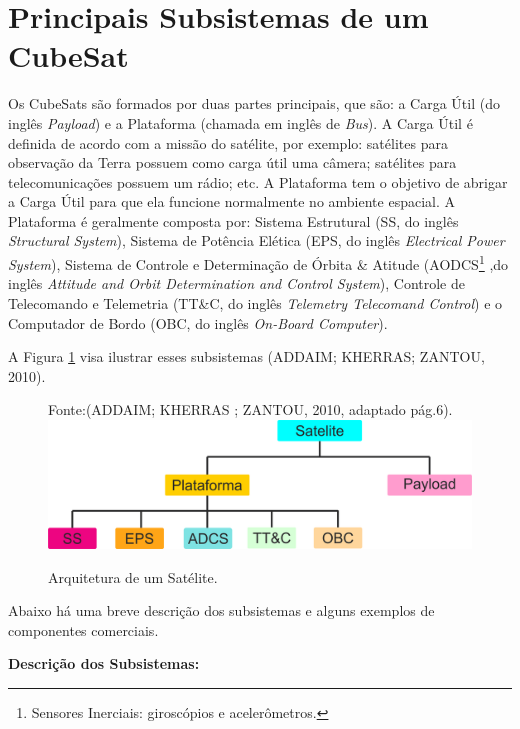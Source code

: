 \section{Principais Subsistemas de um CubeSat}

Os CubeSats são formados por duas partes principais, que são: a Carga Útil (do inglês \textit{Payload}) e a Plataforma (chamada em inglês de \textit{Bus}). A Carga Útil é definida de acordo com a missão do satélite, por exemplo: satélites para observação da Terra possuem como carga útil uma câmera; satélites para telecomunicações possuem um rádio; etc. A Plataforma tem o objetivo de abrigar a Carga Útil para que ela funcione normalmente no ambiente espacial. A Plataforma é geralmente composta por: Sistema Estrutural (SS, do inglês \textit{Structural System}), Sistema de Potência Elética (EPS, do inglês \textit{Electrical Power System}), Sistema de Controle e Determinação de Órbita \& Atitude (AODCS\footnote{Sensores Inerciais: giroscópios e acelerômetros.} ,do inglês \textit{Attitude and Orbit Determination and Control System}), Controle de Telecomando e Telemetria (TT\&C, do inglês \textit{Telemetry Telecomand Control}) e o Computador de Bordo (OBC, do inglês \textit{On-Board Computer}). 	

\newpage

A Figura \ref{fig06} visa ilustrar esses subsistemas (ADDAIM; KHERRAS; ZANTOU, 2010).

\begin{figure}[h]
\footnotesize{
	\centering
	Fonte:(ADDAIM; KHERRAS ; ZANTOU, 2010, adaptado pág.6).
	\includegraphics[keepaspectratio=true,scale=0.57]{figuras/estrutura_satellite.png}
	\caption{Arquitetura de um Satélite.}	
	\label{fig06}
}
\end{figure}
\FloatBarrier


Abaixo há uma breve descrição dos subsistemas e alguns exemplos de componentes comerciais.

\textbf{Descrição dos Subsistemas:}

